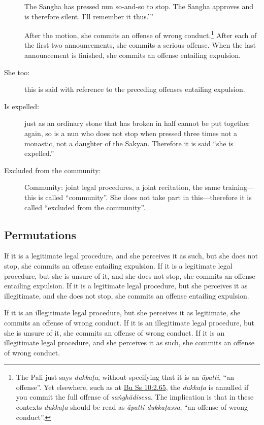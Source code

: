 \documentclass[12pt,openany]{book}%
\begin{document}
\begin{description}
The Sangha has pressed nun so-and-so to stop. The Sangha approves and is therefore silent. I’ll remember it thus.’” 

After the motion, she commits an offense of wrong conduct.\footnote{The Pali just says \textit{\textsanskrit{dukkaṭa}}, without specifying that it is an \textit{\textsanskrit{āpatti}}, “an offense”. Yet elsewhere, such as at \href{https://suttacentral.net/pli-tv-bu-vb-ss10/en/brahmali\#2.65}{Bu Ss 10:2.65}, the \textit{\textsanskrit{dukkaṭa}} is annulled if you commit the full offense of \textit{\textsanskrit{saṅghādisesa}}. The implication is that in these contexts \textit{\textsanskrit{dukkaṭa}} should be read as \textit{\textsanskrit{āpatti} \textsanskrit{dukkaṭassa}}, “an offense of wrong conduct”. }  After each of the first two announcements, she commits a serious offense.  When the last announcement is finished, she commits an offense entailing expulsion. 

%
\item[She too: ] this is said with reference to the preceding offenses entailing expulsion. %
\item[Is expelled: ] just as an ordinary stone that has broken in half cannot be put together again, so is a nun who does not stop when pressed three times not a monastic, not a daughter of the Sakyan. Therefore it is said “she is expelled.” %
\item[Excluded from the community: ] Community: joint legal procedures, a joint recitation, the same training—this is called “community”. She does not take part in this—therefore it is called “excluded from the community”. %
\end{description}

\subsection*{Permutations }

If it is a legitimate legal procedure, and she perceives it as such, but she does not stop, she commits an offense entailing expulsion. If it is a legitimate legal procedure, but she is unsure of it, and she does not stop, she commits an offense entailing expulsion. If it is a legitimate legal procedure, but she perceives it as illegitimate, and she does not stop, she commits an offense entailing expulsion. 

If it is an illegitimate legal procedure, but she perceives it as legitimate, she commits an offense of wrong conduct. If it is an illegitimate legal procedure, but she is unsure of it, she commits an offense of wrong conduct. If it is an illegitimate legal procedure, and she perceives it as such, she commits an offense of wrong conduct. 
\end{document}
